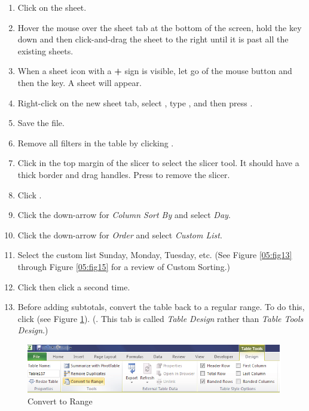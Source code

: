 \begin{enumerate}
	\item Click on the  sheet.
	\item Hover the mouse over the  sheet tab at the bottom of the screen, hold the  key down and then click-and-drag the sheet to the right until it is past all the existing sheets.
	\item When a sheet icon with a \textbf{+} sign is visible, let go of the mouse button and then the  key. A  sheet will appear.
	\item Right-click on the new sheet tab, select , type , and then press .
	\item Save the file.
	\item Remove all filters in the table by clicking .
	\item Click in the top margin of the slicer to select the slicer tool. It should have a thick border and drag handles. Press  to remove the slicer.

	\item Click . 
	\item Click the down-arrow for \textit{Column Sort By} and select \textit{Day}.
	\item Click the down-arrow for \textit{Order} and select \textit{Custom List}.
	\item Select the custom list Sunday, Monday, Tuesday, etc. (See Figure \ref{05:fig13} through Figure \ref{05:fig15} for a review of Custom Sorting.)
	\item Click  then click  a second time.
	\item Before adding subtotals, convert the table back to a regular range. To do this, click  (see Figure \ref{05:fig23}). (. This tab is called \textit{Table Design} rather than \textit{Table Tools Design}.)
\end{enumerate}

\begin{figure}[H]
	\centering
	\includegraphics[width=\maxwidth{.95\linewidth}]{gfx/ch05_fig23}
	\caption{Convert to Range}
	\label{05:fig23}
\end{figure}

